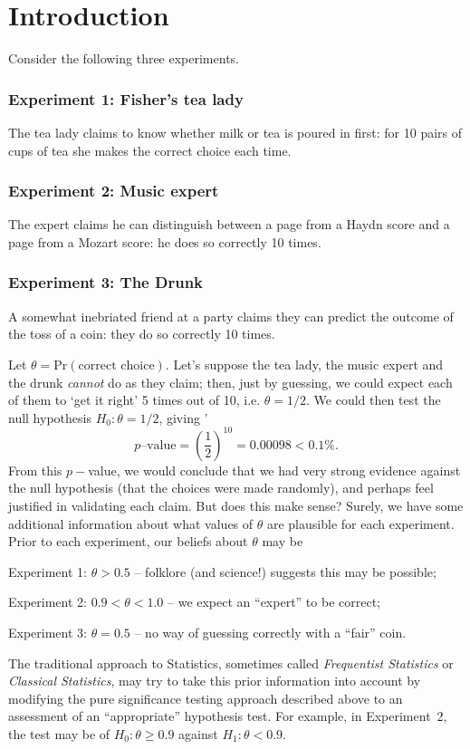 \chapter{Introduction}

Consider the following three experiments.
\subsection*{Experiment 1: Fisher's tea lady}
The tea lady claims to know whether milk or tea is poured in first:
for 10 pairs of cups of tea she makes the correct choice each time.
\subsection*{Experiment 2: Music expert}
The expert claims he can distinguish between a page from a Haydn score
and a page from a Mozart score: he does so correctly 10 times.
\subsection*{Experiment 3: The Drunk}
A somewhat inebriated friend at a party claims they can predict the
outcome of the toss of a coin: they do so correctly 10 times.

Let $\theta=\text{Pr}(\text{correct choice})$. Let's suppose the tea lady, the music expert and the drunk \textit{cannot} do as they claim; then, just by guessing, we could expect each of them to `get it right' 5 times out of 10, i.e. $\theta=1/2$. We could then test the null hypothesis $H_0:\theta=1/2$, giving
'$$p\text{--value}=\left(\frac{1}{2}\right)^{10}=0.00098 < 0.1\%.$$
From this $p-$value, we would conclude that we had very strong
evidence against the null hypothesis (that the choices were made
randomly), and perhaps feel justified in validating each claim.  But
does this make sense? Surely, we have some additional information
about what values of $\theta$ are plausible for each experiment. Prior
to each experiment, our beliefs about $\theta$ may be

Experiment 1: $\theta>0.5$ -- folklore (and science!) suggests this may be possible;

Experiment 2: $0.9<\theta<1.0$ -- we expect an ``expert'' to be
correct;

Experiment 3: $\theta=0.5$ -- no way of guessing correctly with a
``fair'' coin.

The traditional approach to Statistics, sometimes called {\it
Frequentist Statistics} or {\it Classical Statistics}, may try to take
this prior information into account by modifying the pure significance
testing approach described above to an assessment of an
``appropriate'' hypothesis test. For example, in Experiment~2, the
test may be of $H_0:\theta\geq 0.9$ against $H_1:\theta<0.9$.

